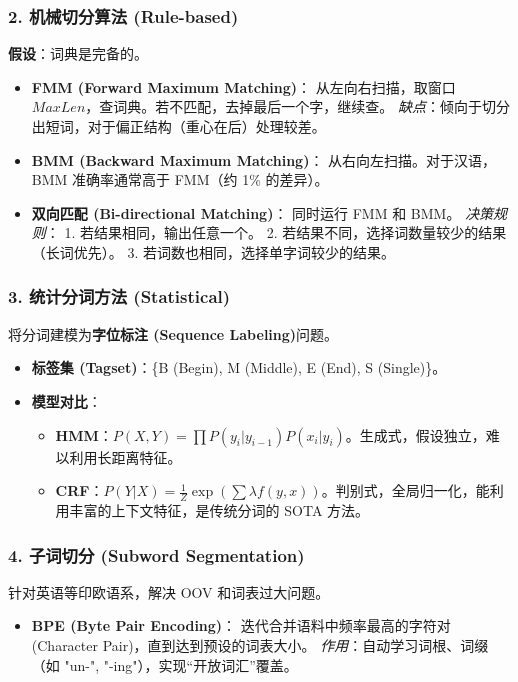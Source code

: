 \documentclass[a4paper, 11pt]{ctexart}
\begin{document}
\subsubsection{2. 机械切分算法 (Rule-based)}
\textbf{假设}：词典是完备的。
\begin{algorithm}[H]
    \caption{正向/逆向最大匹配算法}
    \begin{itemize}
        \item \textbf{FMM (Forward Maximum Matching)}：
        从左向右扫描，取窗口 $MaxLen$，查词典。若不匹配，去掉最后一个字，继续查。
        \textit{缺点}：倾向于切分出短词，对于偏正结构（重心在后）处理较差。
        \item \textbf{BMM (Backward Maximum Matching)}：
        从右向左扫描。对于汉语，BMM 准确率通常高于 FMM（约 1\% 的差异）。
        \item \textbf{双向匹配 (Bi-directional Matching)}：
        同时运行 FMM 和 BMM。
        \textit{决策规则}：
        1. 若结果相同，输出任意一个。
        2. 若结果不同，选择词数量较少的结果（长词优先）。
        3. 若词数也相同，选择单字词较少的结果。
    \end{itemize}
\end{algorithm}

\subsubsection{3. 统计分词方法 (Statistical)}
将分词建模为\textbf{字位标注 (Sequence Labeling)}问题。
\begin{itemize}
    \item \textbf{标签集 (Tagset)}：\{B (Begin), M (Middle), E (End), S (Single)\}。
    \item \textbf{模型对比}：
    \begin{itemize}
        \item \textbf{HMM}：$P(X, Y) = \prod P(y_i|y_{i-1}) P(x_i|y_i)$。生成式，假设独立，难以利用长距离特征。
        \item \textbf{CRF}：$P(Y|X) = \frac{1}{Z} \exp(\sum \lambda f(y, x))$。判别式，全局归一化，能利用丰富的上下文特征，是传统分词的 SOTA 方法。
    \end{itemize}
\end{itemize}

\subsubsection{4. 子词切分 (Subword Segmentation)}
针对英语等印欧语系，解决 OOV 和词表过大问题。
\begin{itemize}
    \item \textbf{BPE (Byte Pair Encoding)}：
    迭代合并语料中频率最高的字符对 (Character Pair)，直到达到预设的词表大小。
    \textit{作用}：自动学习词根、词缀（如 "un-", "-ing"），实现“开放词汇”覆盖。
\end{itemize}
\end{document}
